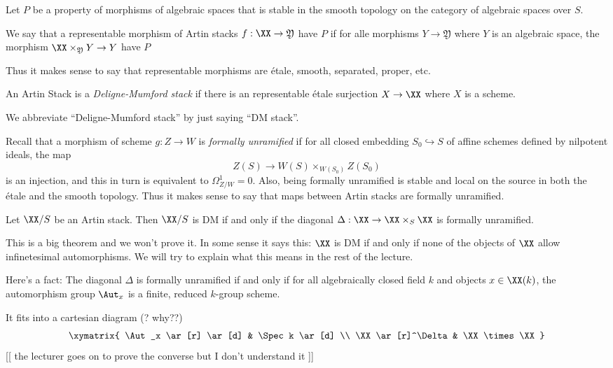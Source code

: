 \documentclass[11pt, english]{article}
\begin{document}
\begin{defi}
Let $P$ be a property of morphisms of algebraic spaces that is stable in the smooth topology on the category of algebraic spaces over $S$.

We say that a representable morphism of Artin stacks $f: \XX \to \mathfrak Y$ have $P$ if for alle morphisms $Y \to \mathfrak Y$ where $Y$ is an algebraic space, the morphism $\XX \times_{\mathfrak Y} Y \to Y$ have $P$
\end{defi}


Thus it makes sense to say that representable morphisms are étale, smooth, separated, proper, etc.

\begin{defi}
An Artin Stack is a \emph{Deligne-Mumford stack} if there is an representable étale surjection $X \to \XX$ where $X$ is a scheme.
\end{defi}
We abbreviate ``Deligne-Mumford stack'' by just saying ``DM stack''. 


Recall that a morphism of scheme $g:Z \to W$ is \emph{formally unramified} if for all closed embedding $S_0 \hookrightarrow S$ of affine schemes defined by nilpotent ideals, the map
\[
Z(S) \to W(S) \times_{W(S_0)} Z(S_0)
\]
is an injection, and this in turn is equivalent to $\Omega_{Z/W}^1 = 0$. Also, being formally unramified is stable and local on the source in both the étale and the smooth topology. Thus it makes sense to say that maps between Artin stacks are formally unramified. 

\begin{thm}
Let $\XX/S$ be an Artin stack. Then $\XX/S$ is DM if and only if the diagonal $\Delta: \XX \to \XX \times_S \XX$ is formally unramified.
\end{thm}

This is a big theorem and we won't prove it. In some sense it says this: $\XX$ is DM if and only if none of the objects of $\XX$ allow infinetesimal automorphisms. We will try to explain what this means in the rest of the lecture.

Here's a fact: The diagonal $\Delta$ is formally unramified if and only if for all algebraically closed field $k$ and objects $x \in \XX(k)$, the automorphism group $\Aut_x$ is a finite, reduced $k$-group scheme. 

It fits into a cartesian diagram (? why??)
\[
\xymatrix{
\Aut_x \ar[r] \ar[d] & \Spec k \ar[d] \\
\XX \ar[r]^\Delta & \XX \times \XX
}
\]
[[ the lecturer goes on to prove the converse but I don't understand it ]]
\end{document}
